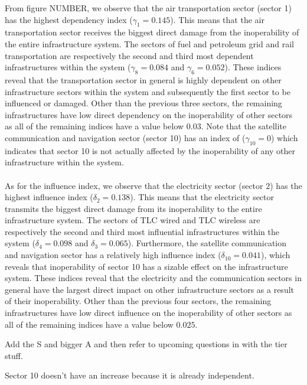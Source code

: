 \documentclass[11pt,a4paper]{article}
\begin{document}
From figure NUMBER, we observe that the air transportation sector (sector 1) has the highest dependency index ($\gamma_1 = 0.145$). This means that the air transportation sector
receives the biggest direct damage from the inoperability of the entire infrastructure system. The sectors of fuel and petroleum grid and rail transportation are respectively the second and third most dependent infrastructures within the system ($\gamma_8 = 0.084$  and  $\gamma_6 = 0.052$). These indices reveal that the transportation sector in general is highly dependent on other infrastructure sectors within the system and subsequently the first sector to be influenced or damaged. Other than the previous three sectors, the remaining infrastructures have low direct dependency on the inoperability of other sectors as all of the remaining indices have a value below $0.03$. Note that the satellite communication and navigation sector (sector 10) has an index of ($\gamma_10 = 0$) which indicates that sector 10 is not actually affected by the inoperability of any other infrastructure within the system.\\
\\
As for the influence index, we observe that the electricity sector (sector 2) has the highest influence index ($\delta_2 = 0.138$). This means that the electricity sector
transmits the biggest direct damage from its inoperability to the entire infrastructure system. The sectors of TLC wired and TLC wireless are respectively the second and third most influential infrastructures within the system ($\delta_4 = 0.098$  and  $\delta_3 = 0.065$). Furthermore, the satellite communication and navigation sector has a relatively high influence index ($\delta_10 = 0.041$), which reveals that inoperability of sector 10 has a sizable effect on the infrastructure system. These indices reveal that the electricity and the communication sectors in general have the largest direct impact on other infrastructure sectors as a result of their inoperability. Other than the previous four sectors, the remaining infrastructures have low direct influence on the inoperability of other sectors as all of the remaining indices have a value below $0.025$.

Add the S and bigger A
and then refer to upcoming questions in with the tier stuff.

Sector 10 doesn't have an increase because it is already independent.
\end{document}
